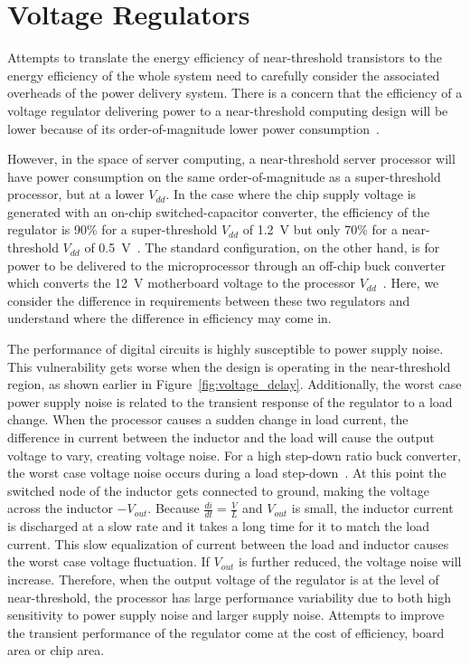 \section{Voltage Regulators}

Attempts to translate the energy efficiency of near-threshold transistors to the energy efficiency of the whole system need to carefully consider the associated overheads of the power delivery system.
There is a concern that the efficiency of a voltage regulator delivering power to a near-threshold computing design will be lower because of its order-of-magnitude lower power consumption~\cite{ISLPED:2011}.

However, in the space of server computing, a near-threshold server processor will have power consumption on the same order-of-magnitude as a super-threshold processor, but at a lower $V_{dd}$.
In the case where the chip supply voltage is generated with an on-chip switched-capacitor converter, the efficiency of the regulator is 90\% for a super-threshold $V_{dd}$ of \SI{1.2}{\volt} but only 70\% for a near-threshold $V_{dd}$ of \SI{0.5}{\volt}~\cite{Pitfall:2010}.
The standard configuration, on the other hand, is for power to be delivered to the microprocessor through an off-chip buck converter which converts the \SI{12}{\volt} motherboard voltage to the processor $V_{dd}$~\cite{Server:2006}.
Here, we consider the difference in requirements between these two regulators and understand where the difference in efficiency may come in. 

The performance of digital circuits is highly susceptible to power supply noise.
This vulnerability gets worse when the design is operating in the near-threshold region, as shown earlier in Figure~\ref{fig:voltage_delay}.
Additionally, the worst case power supply noise is related to the transient response of the regulator to a load change.
When the processor causes a sudden change in load current, the difference in current between the inductor and the load will cause the output voltage to vary, creating voltage noise.
For a high step-down ratio buck converter, the worst case voltage noise occurs during a load step-down~\cite{Transient}.
At this point the switched node of the inductor gets connected to ground, making the voltage across the inductor $-V_{out}$.
Because $\frac{di}{dt}=\frac{V}{L}$ and $V_{out}$ is small, the inductor current is discharged at a slow rate and it takes a long time for it to match the load current.
This slow equalization of current between the load and inductor causes the worst case voltage fluctuation.
If $V_{out}$ is further reduced, the voltage noise will increase.
Therefore, when the output voltage of the regulator is at the level of near-threshold, the processor has large performance variability due to both high sensitivity to power supply noise and larger supply noise.
Attempts to improve the transient performance of the regulator come at the cost of efficiency, board area or chip area.

